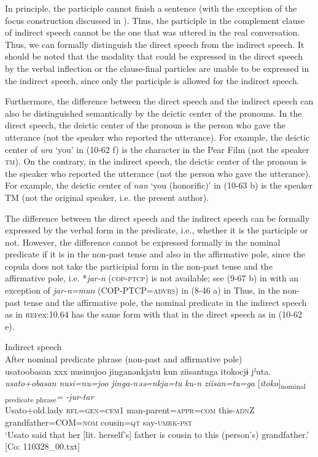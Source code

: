In principle, the participle cannot finish a sentence (with the exception of the focus construction discussed in ). Thus, the participle in the complement clause of indirect speech cannot be the one that was uttered in the real conversation. Thus, we can formally distinguish the direct speech from the indirect speech. It should be noted that the modality that could be expressed in the direct speech by the verbal inflection or the clause-final particles are unable to be expressed in the indirect speech, since only the participle is allowed for the indirect speech.

  Furthermore, the difference between the direct speech and the indirect speech can also be distinguished semantically by the deictic center of the pronouns. In the direct speech, the deictic center of the pronoun is the person who gave the utterance (not the speaker who reported the utterance). For example, the deictic center of \textit{ura} ‘you’ in (10-62 f) is the character in the Pear Film (not the speaker \textsc{tm}). On the contrary, in the indirect speech, the deictic center of the pronoun is the speaker who reported the utterance (not the person who gave the utterance). For example, the deictic center of \textit{nan} ‘you (honorific)’ in (10-63 b) is the speaker TM (not the original speaker, i.e. the present author).

The difference between the direct speech and the indirect speech can be formally expressed by the verbal form in the predicate, i.e., whether it is the participle or not. However, the difference cannot be expressed formally in the nominal predicate if it is in the non-past tense and also in the affirmative pole, since the copula does not take the participial form in the non-past tense and the affirmative pole, i.e. *\textit{jar-n} (\textsc{cop}-\textsc{ptcp}) is not available; see (9-67 b) in  with an exception of \textit{jar-n=mun} (COP-PTCP=\textsc{advrs}) in (8-46 a) in  Thus, in the non-past tense and the affirmative pole, the nominal predicate in the indirect speech as in \textsc{ref}{ex:10.64} has the same form with that in the direct speech as in (10-62 e).

\ea\label{ex:10.64}   Indirect speech\\
  After nominal predicate phrase (non-past and affirmative pole)\\
      \glll    usato{\textbar}obasan{\textbar}  xxx  nusinujoo  jinganənkjatu  kun  ziisantuga  {\textbar}itoko{\textbar}cjɨ   jˀuta.\\
    \textit{usato+obasan}    \textit{nusi=nu=joo}  \textit{jinga-nəə=nkja=tu}  \textit{ku-n}  \textit{ziisan=tu=ga}  [\textit{itoko}]\textsubscript{nominal predicate phrase}\textit{=} \textit{-jur-tar}\\
    Usato+old.lady    \textsc{rfl}=\textsc{gen}=\textsc{cfm}1  man-parent=\textsc{appr}=\textsc{com} this-\textsc{adn}Z  grandfather=COM=\textsc{nom}  cousin=\textsc{qt}   say-\textsc{umrk}-\textsc{pst}\\
    \glt ‘Usato said that her [lit. herself’s] father is cousin to this (person’s) grandfather.’ [Co: 110328\_00.txt]
\z

